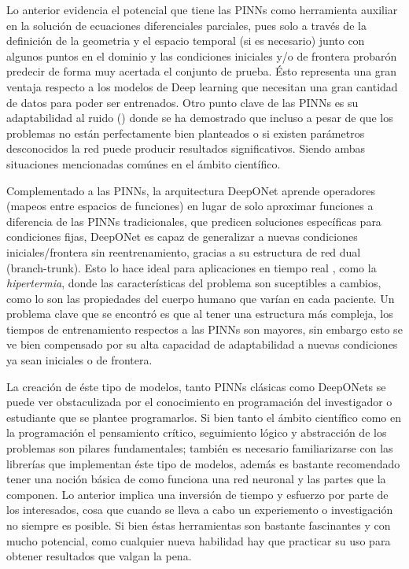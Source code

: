\documentclass[
  spanish,
  us-letterpaper,
  DIV=11,
  numbers=noendperiod]{scrreprt}
\theoremstyle{plain}
\theoremstyle{definition}
\theoremstyle{remark}
\begin{document}
Lo anterior evidencia el potencial que tiene las PINNs como herramienta
auxiliar en la solución de ecuaciones diferenciales parciales, pues solo
a través de la definición de la geometria y el espacio temporal (si es
necesario) junto con algunos puntos en el dominio y las condiciones
iniciales y/o de frontera probarón predecir de forma muy acertada el
conjunto de prueba. Ésto representa una gran ventaja respecto a los
modelos de Deep learning que necesitan una gran cantidad de datos para
poder ser entrenados. Otro punto clave de las PINNs es su adaptabilidad
al ruido ()
donde se ha demostrado que incluso a pesar de que los problemas no están
perfectamente bien planteados o si existen parámetros desconocidos la
red puede producir resultados significativos. Siendo ambas situaciones
mencionadas comúnes en el ámbito científico.

Complementado a las PINNs, la arquitectura DeepONet aprende operadores
(mapeos entre espacios de funciones) en lugar de solo aproximar
funciones a diferencia de las PINNs tradicionales, que predicen
soluciones específicas para condiciones fijas, DeepONet es capaz de
generalizar a nuevas condiciones iniciales/frontera sin reentrenamiento,
gracias a su estructura de red dual (branch-trunk). Esto lo hace ideal
para aplicaciones en tiempo real , como la \emph{hipertermia}, donde las
características del problema son suceptibles a cambios, como lo son las
propiedades del cuerpo humano que varían en cada paciente. Un problema
clave que se encontró es que al tener una estructura más compleja, los
tiempos de entrenamiento respectos a las PINNs son mayores, sin embargo
esto se ve bien compensado por su alta capacidad de adaptabilidad a
nuevas condiciones ya sean iniciales o de frontera.

La creación de éste tipo de modelos, tanto PINNs clásicas como DeepONets
se puede ver obstaculizada por el conocimiento en programación del
investigador o estudiante que se plantee programarlos. Si bien tanto el
ámbito científico como en la programación el pensamiento crítico,
seguimiento lógico y abstracción de los problemas son pilares
fundamentales; también es necesario familiarizarse con las librerías que
implementan éste tipo de modelos, además es bastante recomendado tener
una noción básica de como funciona una red neuronal y las partes que la
componen. Lo anterior implica una inversión de tiempo y esfuerzo por
parte de los interesados, cosa que cuando se lleva a cabo un
experiemento o investigación no siempre es posible. Si bien éstas
herramientas son bastante fascinantes y con mucho potencial, como
cualquier nueva habilidad hay que practicar su uso para obtener
resultados que valgan la pena.
\end{document}
